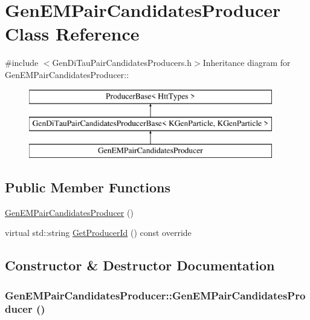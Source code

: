 \hypertarget{classGenEMPairCandidatesProducer}{
\section{GenEMPairCandidatesProducer Class Reference}
\label{classGenEMPairCandidatesProducer}
}


{\ttfamily \#include $<$GenDiTauPairCandidatesProducers.h$>$}Inheritance diagram for GenEMPairCandidatesProducer::\begin{figure}[H]
\begin{center}
\leavevmode
\includegraphics[height=3cm]{classGenEMPairCandidatesProducer}
\end{center}
\end{figure}
\subsection*{Public Member Functions}
\begin{DoxyCompactItemize}
\item 
\hyperlink{classGenEMPairCandidatesProducer_a722b595e2276928c194fa0af96203b5f}{GenEMPairCandidatesProducer} ()
\item 
virtual std::string \hyperlink{classGenEMPairCandidatesProducer_af1cae3d7fa5c04cd3e58a28f309a4bf1}{GetProducerId} () const override
\end{DoxyCompactItemize}


\subsection{Constructor \& Destructor Documentation}
\hypertarget{classGenEMPairCandidatesProducer_a722b595e2276928c194fa0af96203b5f}{
\subsubsection[{GenEMPairCandidatesProducer}]{\setlength{\rightskip}{0pt plus 5cm}GenEMPairCandidatesProducer::GenEMPairCandidatesProducer ()}}
\label{classGenEMPairCandidatesProducer_a722b595e2276928c194fa0af96203b5f}


